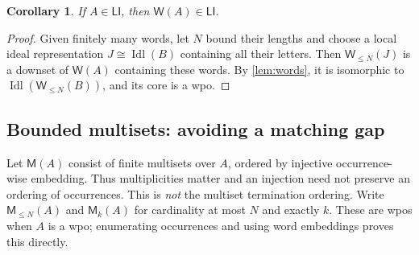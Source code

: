 \documentclass[11pt,letterpaper]{article}
\theoremstyle{teal}
\newtheorem{corollary}[theorem]{Corollary}
\theoremstyle{definition}
\newcommand{\Idl}{\operatorname{Idl}}
\newcommand{\W}{\mathsf W}
\newcommand{\M}{\mathsf M}
\newcommand{\LI}{\mathsf{LI}}
\begin{document}
\begin{corollary}\label{cor:words-closure}
If $A\in\LI$, then $\W(A)\in\LI$.
\end{corollary}
\begin{proof}
Given finitely many words, let $N$ bound their lengths and choose a local ideal representation $J\cong\Idl(B)$ containing all their letters. Then $\W_{\leq N}(J)$ is a downset of $\W(A)$ containing these words. By \cref{lem:words}, it is isomorphic to $\Idl(\W_{\leq N}(B))$, and its core is a wpo.
\end{proof}

\subsection{Bounded multisets: avoiding a matching gap}
Let $\M(A)$ consist of finite multisets over $A$, ordered by injective occurrence-wise embedding. Thus multiplicities matter and an injection need not preserve an ordering of occurrences. This is \emph{not} the multiset termination ordering. Write $\M_{\leq N}(A)$ and $\M_k(A)$ for cardinality at most $N$ and exactly $k$. These are wpos when $A$ is a wpo; enumerating occurrences and using word embeddings proves this directly.
\end{document}
